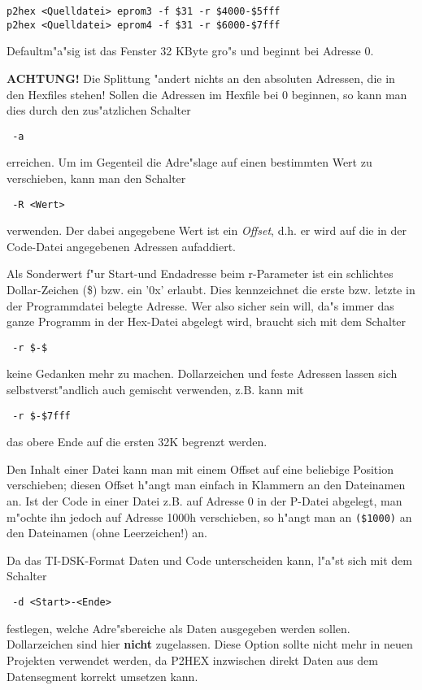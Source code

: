\documentclass[12pt,a4paper,twoside]{report}
\newcommand{\bb}[1]{{\bf #1}}
\newcommand{\tty}[1]{{\tt #1}}
\begin{document}
{\begin{verbatim}
p2hex <Quelldatei> eprom3 -f $31 -r $4000-$5fff
p2hex <Quelldatei> eprom4 -f $31 -r $6000-$7fff
\end{verbatim}
Defaultm"a"sig ist das Fenster 32 KByte gro"s und beginnt bei Adresse 0.
\par
\bb{ACHTUNG!} Die Splittung "andert nichts an den absoluten Adressen, die
in den Hexfiles stehen!  Sollen die Adressen im Hexfile bei 0 beginnen,
so kann man dies durch den zus"atzlichen Schalter
\begin{verbatim}
 -a
\end{verbatim}
erreichen.  Um im Gegenteil die Adre"slage auf einen bestimmten Wert zu
verschieben, kann man den Schalter
\begin{verbatim}
 -R <Wert>
\end{verbatim}
verwenden.  Der dabei angegebene Wert ist ein {\em Offset}, d.h. er wird
auf die in der Code-Datei angegebenen Adressen aufaddiert.
\par
Als Sonderwert f"ur Start-und Endadresse beim r-Parameter ist ein
schlichtes Dollar-Zeichen (\$) bzw. ein '0x' erlaubt.  Dies kennzeichnet
die erste bzw. letzte in der Programmdatei belegte Adresse.  Wer also
sicher sein will, da"s immer das ganze Programm in der Hex-Datei abgelegt
wird, braucht sich mit dem Schalter
\begin{verbatim}
 -r $-$
\end{verbatim}
keine Gedanken mehr zu machen.  Dollarzeichen und feste Adressen
lassen sich selbstverst"andlich auch gemischt verwenden, z.B. kann
mit
\begin{verbatim}
 -r $-$7fff
\end{verbatim}
das obere Ende auf die ersten 32K begrenzt werden.
\par
Den Inhalt einer Datei kann man mit einem Offset auf eine beliebige
Position verschieben; diesen Offset h"angt man einfach in Klammern an
den Dateinamen an.  Ist der Code in einer Datei z.B. auf Adresse 0 in
der P-Datei abgelegt, man m"ochte ihn jedoch auf Adresse 1000h
verschieben, so h"angt man an \tty{(\$1000)} an den Dateinamen (ohne
Leerzeichen!) an.
\par
Da das TI-DSK-Format Daten und Code unterscheiden kann, l"a"st sich
mit dem Schalter
\begin{verbatim}
 -d <Start>-<Ende>
\end{verbatim}
festlegen, welche Adre"sbereiche als Daten ausgegeben werden sollen.
Dollarzeichen sind hier \bb{nicht} zugelassen.  Diese Option sollte
nicht mehr in neuen Projekten verwendet werden, da P2HEX inzwischen
direkt Daten aus dem Datensegment korrekt umsetzen kann.

}
\end{document}

